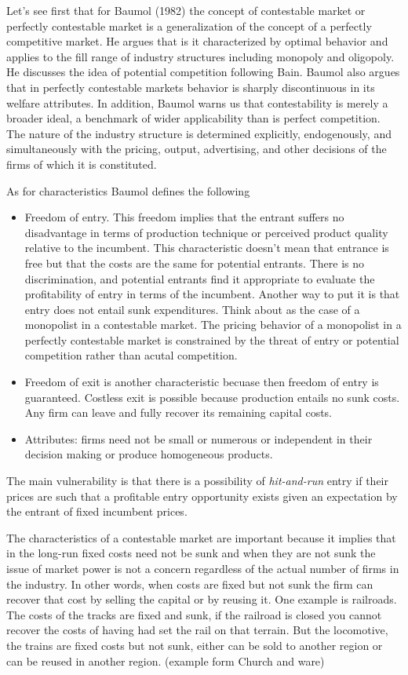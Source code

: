 \documentclass[11pt]{article} %
\begin{document}
Let's see first that for Baumol (1982) the concept of contestable market or perfectly contestable market is a generalization of the concept of a perfectly competitive market. He argues that is it characterized by optimal behavior and applies to the fill range of industry structures including monopoly and oligopoly. He discusses the idea of potential competition following Bain. Baumol also argues that in perfectly contestable markets behavior is sharply discontinuous in its welfare attributes. In addition, Baumol warns us that contestability is merely a broader ideal, a benchmark of wider applicability than is perfect competition. The nature of the industry structure is determined explicitly, endogenously, and simultaneously with the pricing, output, advertising, and other decisions of the firms of which it is constituted.

As for characteristics Baumol defines the following

\begin{itemize}
\item Freedom of entry. This freedom implies that the entrant suffers no disadvantage in terms of production technique or perceived product quality relative to the incumbent. This characteristic doesn't mean that entrance is free but that the costs are the same for potential entrants. There is no discrimination, and potential entrants find it appropriate to evaluate the profitability of entry in terms of the incumbent. Another way to put it is that entry does not entail sunk expenditures. Think about as the case of a monopolist in a contestable market. The pricing behavior of a monopolist in a perfectly contestable market is constrained by the threat of entry or potential competition rather than acutal competition.
\item Freedom of exit is another characteristic becuase then freedom of entry is guaranteed. Costless exit is possible because production entails no sunk costs. Any firm can leave and fully recover its remaining capital costs.
\item Attributes: firms need not be small or numerous or independent in their decision making or produce homogeneous products.
\end{itemize}

The main vulnerability is that there is a possibility of \textit{hit-and-run} entry if their prices are such that a profitable entry opportunity exists given an expectation by the entrant of fixed incumbent prices.

The characteristics of a contestable market are important because it implies that in the long-run fixed costs need not be sunk and when they are not sunk the issue of market power is not a concern regardless of the actual number of firms in the industry. In other words, when costs are fixed but not sunk the firm can recover that cost by selling the capital or by reusing it. One example is railroads. The costs of the tracks are fixed and sunk, if the railroad is closed you cannot recover the costs of having had set the rail on that terrain. But the locomotive, the trains are fixed costs but not sunk, either can be sold to another region or can be reused in another region. (example form Church and ware) 
\end{document}
